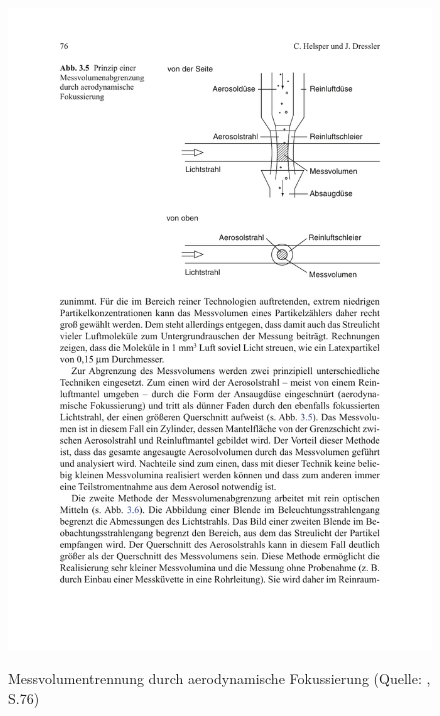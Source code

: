 \begin{figure}[H]
	\myfloatalign
	{\includegraphics[width=.9\linewidth]{gfx/requirements/aerodynamisch_fokus.pdf}} \quad
	\caption[Messvolumentrennung durch aerodynamische Fokussierung (Quelle: \cite{reinraum}, S.76)]
	{Messvolumentrennung durch aerodynamische Fokussierung (Quelle: \cite{reinraum}, S.76)}
	\label{fig:aerodynamisch_trennung}
\end{figure}

